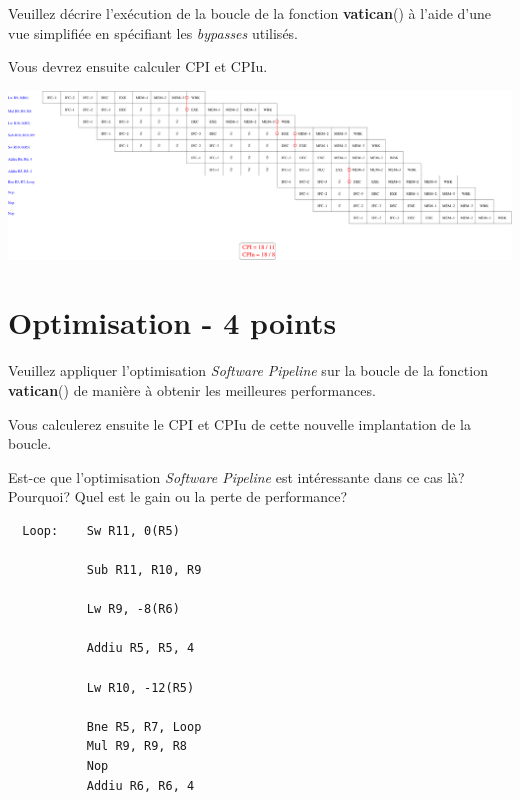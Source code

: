 {Veuillez d\'ecrire l'ex\'ecution de la boucle de la fonction \textbf{vatican}()
\`a l'aide d'une vue simplifi\'ee en sp\'ecifiant les \textit{bypasses}
utilis\'es.

Vous devrez ensuite calculer CPI et CPIu.

\begin{correction}

  \begin{center}
    \includegraphics[scale=0.33]{figures/correction-analyse-simplifiee.pdf}
  \end{center}

\end{correction}

%
%

\section{Optimisation - 4 points}

Veuillez appliquer l'optimisation \textit{Software Pipeline} sur
la boucle de la fonction \textbf{vatican}() de mani\`ere \`a obtenir
les meilleures performances.

Vous calculerez ensuite le CPI et CPIu de cette nouvelle implantation
de la boucle.

Est-ce que l'optimisation \textit{Software Pipeline} est int\'eressante
dans ce cas l\`a? Pourquoi? Quel est le gain ou la perte de performance?

\begin{correction}

  \begin{verbatim}
  Loop:    Sw R11, 0(R5)

           Sub R11, R10, R9

           Lw R9, -8(R6)

           Addiu R5, R5, 4

           Lw R10, -12(R5)

           Bne R5, R7, Loop
           Mul R9, R9, R8
           Nop
           Addiu R6, R6, 4
  \end{verbatim}


\end{correction}}

